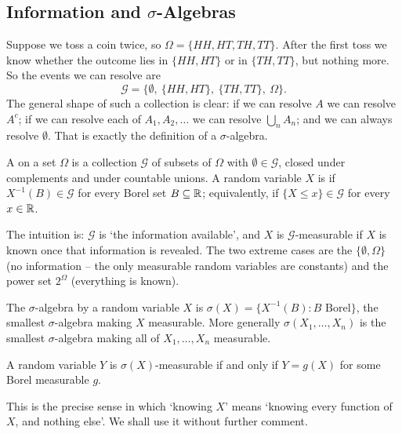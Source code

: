 \documentclass[a4paper]{scrartcl}
\begin{document}
\subsection{Information and \texorpdfstring{$\sigma$}{sigma}-Algebras}

Suppose we toss a coin twice, so $\Omega = \{HH, HT, TH, TT\}$. After the first toss we know whether the outcome lies in $\{HH,HT\}$ or in $\{TH,TT\}$, but nothing more. So the events we can resolve are
$$
\mathcal{G} = \big\{\emptyset,\ \{HH,HT\},\ \{TH,TT\},\ \Omega\big\}.
$$
The general shape of such a collection is clear: if we can resolve $A$ we can resolve $A^c$; if we can resolve each of $A_1, A_2, \dots$ we can resolve $\bigcup_n A_n$; and we can always resolve $\emptyset$. That is exactly the definition of a $\sigma$-algebra.

\begin{definition}
	A  on a set $\Omega$ is a collection $\mathcal{G}$ of subsets of $\Omega$ with $\emptyset \in \mathcal{G}$, closed under complements and under countable unions. A random variable $X$ is  if $X^{-1}(B) \in \mathcal{G}$ for every Borel set $B \subseteq \mathbb{R}$; equivalently, if $\{X \leq x\} \in \mathcal{G}$ for every $x \in \mathbb{R}$.
\end{definition}

The intuition is: $\mathcal{G}$ is `the information available', and $X$ is $\mathcal{G}$-measurable if $X$ is known once that information is revealed. The two extreme cases are the  $\{\emptyset,\Omega\}$ (no information -- the only measurable random variables are constants) and the power set $2^\Omega$ (everything is known).

\begin{definition}
	The $\sigma$-algebra  by a random variable $X$ is $\sigma(X) = \{X^{-1}(B) : B \text{ Borel}\}$, the smallest $\sigma$-algebra making $X$ measurable. More generally $\sigma(X_1,\dots,X_n)$ is the smallest $\sigma$-algebra making all of $X_1,\dots,X_n$ measurable.
\end{definition}

\begin{fact}
	A random variable $Y$ is $\sigma(X)$-measurable if and only if $Y = g(X)$ for some Borel measurable $g$.
\end{fact}

This is the precise sense in which `knowing $X$' means `knowing every function of $X$, and nothing else'. We shall use it without further comment.
\end{document}
